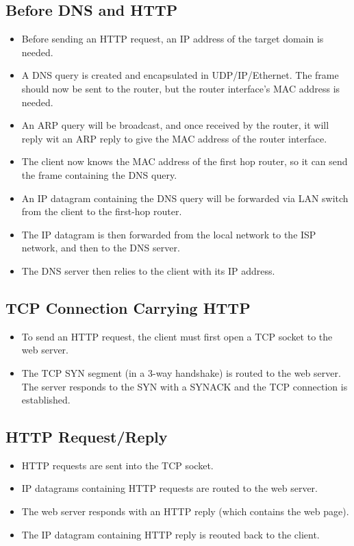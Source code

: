 \documentclass{article}
\begin{document}
\subsection{Before DNS and HTTP}

\begin{itemize}
\item Before sending an HTTP request, an IP address of the target domain is needed.
\item A DNS query is created and encapsulated in UDP/IP/Ethernet. The frame should now be sent to the router, but the router interface's MAC address is needed.
\item An ARP query will be broadcast, and once received by the router, it will reply wit an ARP reply to give the MAC address of the router interface.
\item The client now knows the MAC address of the first hop router, so it can send the frame containing the DNS query.
\item An IP datagram containing the DNS query will be forwarded via LAN switch from the client to the first-hop router.
\item The IP datagram is then forwarded from the local network to the ISP network, and then to the DNS server.
\item The DNS server then relies to the client with its IP address.
\end{itemize}

\subsection{TCP Connection Carrying HTTP}

\begin{itemize}
\item To send an HTTP request, the client must first open a TCP socket to the web server.
\item The TCP SYN segment (in a 3-way handshake) is routed to the web server. The server responds to the SYN with a SYNACK and the TCP connection is established.
\end{itemize}

\subsection{HTTP Request/Reply}

\begin{itemize}
\item HTTP requests are sent into the TCP socket.
\item IP datagrams containing HTTP requests are routed to the web server.
\item The web server responds with an HTTP reply (which contains the web page).
\item The IP datagram containing HTTP reply is reouted back to the client.
\end{itemize}
\end{document}
